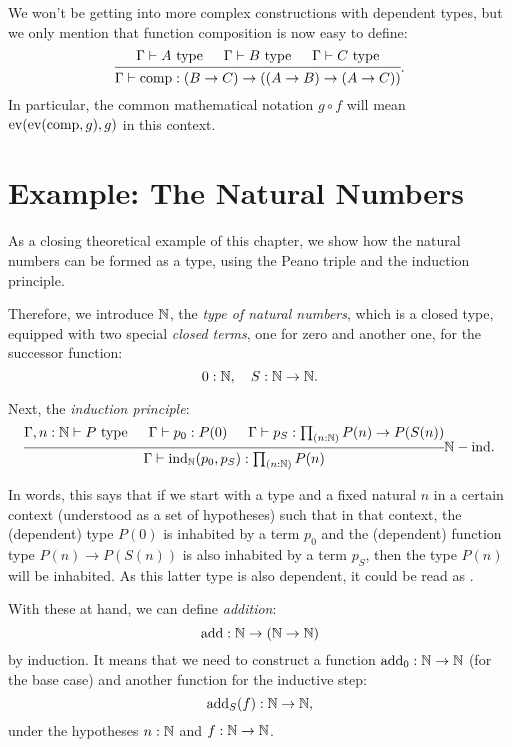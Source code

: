 We won't be getting into more complex constructions with dependent types,
but we only mention that function composition is now easy to define:
\[
  \begin{prooftree}
    \hypo{\Gamma \vdash A \text{ type}}
    \hypo{\Gamma \vdash B \text{ type}}
    \hypo{\Gamma \vdash C \text{ type}}
    \infer3{\Gamma \vdash \dr{comp} : (B \to C) \to ((A \to B) \to (A \to C))}
  \end{prooftree}.
\]
In particular, the common mathematical notation $ g \circ f $ will
mean $ \mathrm{ev}(\mathrm{ev}(\mathrm{comp},g),g) $ in this context.

\section{Example: The Natural Numbers}
\label{sec:nat-ind}

\indent\indent As a closing theoretical example of this chapter, we show how the natural
numbers can be formed as a type, using the Peano triple and the induction
principle.

Therefore, we introduce $ \mathbb{N} $, the \emph{type of natural numbers}, which
is a closed type, equipped with two special \emph{closed terms}, one for
zero and another one, for the successor function:
\[
  0 : \mathbb{N}, \quad S : \mathbb{N} \to \mathbb{N}.
\]

Next, the \emph{induction principle}:
\[
  \begin{prooftree}
    \hypo{\Gamma, n : \NN \vdash P \text{ type}}
    \hypo{\Gamma \vdash p_0 : P(0)}
    \hypo{\Gamma \vdash p_S : \prod_{(n : \NN)} P(n) \to P(S(n))}
    \infer3{\Gamma \vdash \dr{ind}_{\NN} (p_0, p_S) : \prod_{(n : \NN)} P(n)}.
  \end{prooftree}\NN-\text{ind}.
\]

In words, this says that if we start with a type and a fixed natural $ n $
in a certain context (understood as a set of hypotheses) such that
in that context, the (dependent) type $ P(0) $ is inhabited by
a term $ p_0 $ and the (dependent) function type $ P(n) \to P(S(n)) $
is also inhabited by a term $ p_S $, then the type $ P(n) $ will
be inhabited. As this latter type is also dependent, it could be
read as .

With these at hand, we can define \emph{addition}:
\[
  \mathrm{add} : \mathbb{N} \to (\mathbb{N} \to \mathbb{N})
\]
by induction. It means that we need to construct a function
$ \mathrm{add}_0 : \mathbb{N} \to \mathbb{N} $ (for the base case) and another
function for the inductive step:
\[
  \mathrm{add}_S(f) : \mathbb{N} \to \mathbb{N},
\]
under the hypotheses $ n : \mathbb{N} $ and $ f : \mathbb{N} \to \mathbb{N} $.

